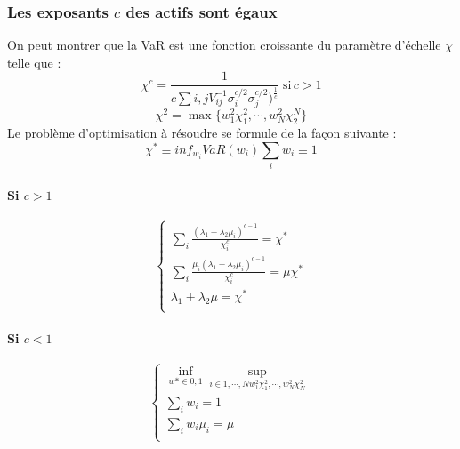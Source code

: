 \documentclass{article}
\begin{document}
       \subsubsection{Les exposants $c$ des actifs sont égaux}
     On peut montrer que la VaR est une fonction croissante du paramètre d'échelle $\chi $ telle que :
     \begin{equation}
       \chi ^{c} = \frac{1}{c\sum i,jV_{ij}^{-1}\sigma_{i}^{c/2}\sigma ^{c/2}_{j})^{\frac{1}{c}}}\;\text{si}\, c>1
       \end{equation}  
      \begin{equation}
      \chi ^{2}=\max \lbrace w^{2}_{1}\chi _{1}^{2},\cdots ,w_{N}^{2}\chi ^{N}_{2}\rbrace
      \end{equation}
       Le problème d'optimisation à résoudre se formule de la façon suivante :
       \begin{equation}
       \chi^{*}\equiv inf_{w_{i}}VaR({w_{i}})
       \sum _{i} w_{i}\equiv 1
       \end{equation}
      \paragraph{Si $c>1$}
     \begin{equation}
      \left\{
      \begin{aligned}
     \sum_{i}\frac{(\lambda _{1}+\lambda_{2}\mu _{i})^{c-1}}{\chi _{i}^{c}}=\chi^{*}\\
      \sum_{i}\frac{\mu _{i}(\lambda _{1}+\lambda_{2}\mu _{i})^{c-1}}{\chi _{i}^{c}}=\mu \chi^{*}\\
      \lambda_{1}+\lambda_{2}\mu =\chi ^{*}\\
      \end{aligned}
    \right.
     \end{equation}
      \paragraph{Si $c<1$}
      \begin{equation}
      \left\{
      \begin{aligned}
    \inf_{w*\in {0,1}}{\sup_{i\in {1,\cdots ,N}{w_{1}^{2}\chi ^{2}_{1},\cdots ,w_{N}^{2}\chi ^{2}_{N}}}}\\
      \sum _{i} w_{i}=1\\
      \sum _{i} w_{i}\mu_{i}=\mu\\
      \end{aligned}
    \right.
      \end{equation}
\end{document}
